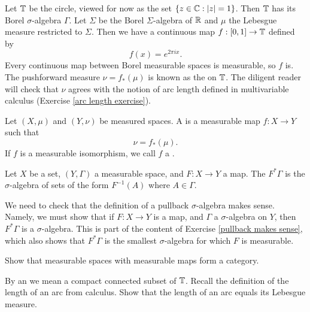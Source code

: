 \begin{example}
\label{lebesgue measure torus}
Let $\mathbb{T}$ be the circle, viewed for now as the set $\{z \in \mathbb{C}: |z| = 1\}$.
Then $\mathbb{T}$ has its Borel $\sigma$-algebra $\Gamma$.
Let $\Sigma$ be the Borel $\Sigma$-algebra of $\mathbb{R}$ and $\mu$ the Lebesgue measure restricted to $\Sigma$.
Then we have a continuous map $f: [0, 1] \to \mathbb{T}$ defined by
\[f(x) = e^{2\pi ix}.\]
Every continuous map between Borel measurable spaces is measurable, so $f$ is.
The pushforward measure $\nu = f_*(\mu)$ is known as the  on $\mathbb{T}$.
The diligent reader will check that $\nu$ agrees with the notion of arc length defined in multivariable calculus (Exercise \ref{arc length exercise}).
\end{example}

\begin{definition}
Let $(X, \mu)$ and $(Y, \nu)$ be measured spaces.
A  is a measurable map $f: X \to Y$ such that
\[\nu = f_*(\mu).\]
If $f$ is a measurable isomorphism, we call $f$ a .
\end{definition}

\begin{definition}
Let $X$ be a set, $(Y, \Gamma)$ a measurable space, and $F: X \to Y$ a map.
The  $F^*\Gamma$ is the $\sigma$-algebra of sets of the form $F^{-1}(A)$ where $A \in \Gamma$.
\end{definition}

\begin{subsec}
We need to check that the definition of a pullback $\sigma$-algebra makes sense.
Namely, we must show that if $F: X \to Y$ is a map, and $\Gamma$ a $\sigma$-algebra on $Y$, then $F^*\Gamma$ is a $\sigma$-algebra.
This is part of the content of Exercise \ref{pullback makes sense}, which also shows that $F^*\Gamma$ is the smallest $\sigma$-algebra for which $F$ is measurable.
\end{subsec}

\begin{exercise}
Show that measurable spaces with measurable maps form a category.
\end{exercise}

\begin{exercise}
\label{arc length exercise}
By an  we mean a compact connected subset of $\mathbb{T}$.
Recall the definition of the length of an arc from calculus.
Show that the length of an arc equals its Lebesgue measure.
\end{exercise}

